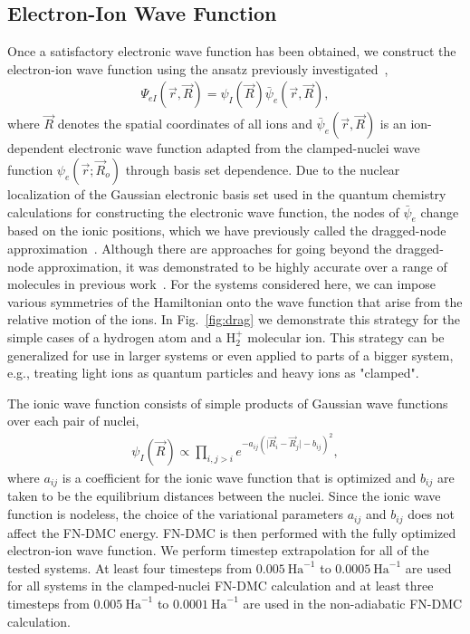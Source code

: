 \documentclass[pra,superscriptaddress,groupedaddress,twocolumn]{revtex4}
\begin{document}
\subsection{Electron-Ion Wave Function}

Once a satisfactory electronic wave function has been obtained, we construct the electron-ion wave function using the ansatz previously investigated~\cite{Tubman_ECG},
\begin{align}
\Psi_{eI}(\vec{r},\vec{R})=\psi_I(\vec{R})\bar{\psi}_e(\vec{r},\vec{R}), \label{eq:psi}
\end{align}
where $\vec{R}$ denotes the spatial coordinates of all ions and $\bar{\psi}_e(\vec{r},\vec{R})$ is an ion-dependent electronic wave function adapted from the clamped-nuclei wave function $\psi_e(\vec{r};\vec{R}_o)$ through basis set dependence. Due to the nuclear localization of the Gaussian electronic basis set used in the quantum chemistry calculations for constructing the electronic wave function, the nodes of $\bar{\psi}_e$ change based on the ionic positions, which we have previously called the dragged-node approximation~\cite{Tubman_ECG}. 
Although there are approaches for going beyond the dragged-node approximation, it was demonstrated to be highly accurate over a range of molecules in previous work~\cite{Tubman_ECG}. For the systems considered here, we can impose various symmetries of the Hamiltonian onto the wave function that arise from the relative motion of the ions. In Fig.~\ref{fig:drag} we demonstrate this strategy for the simple cases of a hydrogen atom and a H$_2^+$ molecular ion. This strategy can be generalized for use in larger systems or even applied to parts of a bigger system, e.g., treating light ions as quantum particles and heavy ions as "clamped".

The ionic wave function consists of simple products of Gaussian wave functions over each pair of nuclei,
\begin{align}
\psi_I(\vec{R})\propto \prod\limits_{i,j>i}e^{-a_{ij}(\vert \vec{R}_i-\vec{R}_j\vert-b_{ij})^2},
\label{wfs_ions}
\end{align}
where $a_{ij}$ is a coefficient for the ionic wave function that is optimized and $b_{ij}$ are taken to be the equilibrium distances between the nuclei. Since the ionic wave function is nodeless, the choice of the variational parameters $a_{ij}$ and $b_{ij}$ does not affect the FN-DMC energy. FN-DMC is then performed with the fully optimized electron-ion wave function. We perform timestep extrapolation for all of the tested systems. At least four timesteps from $0.005~\text{Ha}^{-1}$ to $0.0005~\text{Ha}^{-1}$ are used for all systems in the clamped-nuclei FN-DMC calculation and at least three timesteps from $0.005~\text{Ha}^{-1}$ to $0.0001~\text{Ha}^{-1}$ are used in the non-adiabatic FN-DMC calculation.
\end{document}
